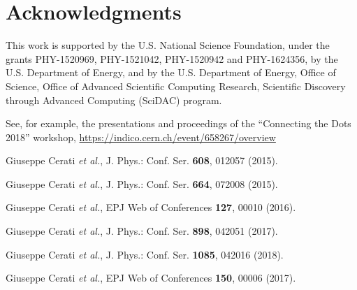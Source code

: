 \documentclass{webofc}
\def\etal{\emph{et al.}\xspace}
\begin{document}
\section{Acknowledgments}

This work is supported by the U.S. National Science Foundation, under the
grants PHY-1520969, PHY-1521042, PHY-1520942 and PHY-1624356, by the
U.S. Department of Energy, and by the U.S. Department of Energy, Office of
Science, Office of Advanced Scientific Computing Research, Scientific
Discovery through Advanced Computing (SciDAC) program.


\begin{thebibliography}{}

 See, for example, the presentations and proceedings of the ``Connecting the Dots 2018'' workshop, \url{https://indico.cern.ch/event/658267/overview}

 Giuseppe Cerati \etal, J. Phys.: Conf. Ser. \textbf{608}, 012057 (2015).

 Giuseppe Cerati \etal, J. Phys.: Conf. Ser. \textbf{664}, 072008 (2015).

 Giuseppe Cerati \etal, EPJ Web of Conferences \textbf{127}, 00010 (2016).

 Giuseppe Cerati \etal, J. Phys.: Conf. Ser. \textbf{898}, 042051 (2017).

 Giuseppe Cerati \etal, J. Phys.: Conf. Ser. \textbf{1085}, 042016 (2018).

 Giuseppe Cerati \etal, EPJ Web of Conferences \textbf{150}, 00006 (2017).

  


\end{thebibliography}


\appendix
\end{document}
